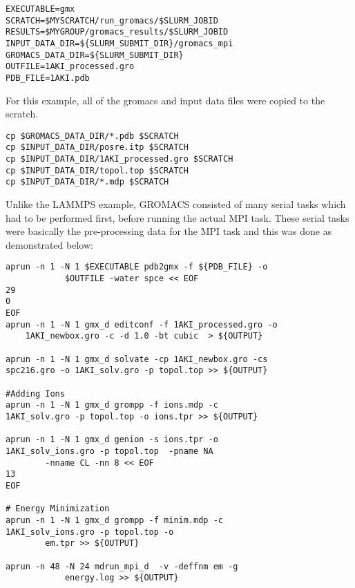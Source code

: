 \begin{tcolorbox}
\begin{Verbatim}[fontsize=\scriptsize]
EXECUTABLE=gmx 
SCRATCH=$MYSCRATCH/run_gromacs/$SLURM_JOBID
RESULTS=$MYGROUP/gromacs_results/$SLURM_JOBID
INPUT_DATA_DIR=${SLURM_SUBMIT_DIR}/gromacs_mpi
GROMACS_DATA_DIR=${SLURM_SUBMIT_DIR}
OUTFILE=1AKI_processed.gro
PDB_FILE=1AKI.pdb
\end{Verbatim}
\end{tcolorbox}

For this example, all of the gromacs and input data files were copied to the scratch.

\begin{tcolorbox}
\begin{Verbatim}[fontsize=\scriptsize] 
cp $GROMACS_DATA_DIR/*.pdb $SCRATCH
cp $INPUT_DATA_DIR/posre.itp $SCRATCH
cp $INPUT_DATA_DIR/1AKI_processed.gro $SCRATCH
cp $INPUT_DATA_DIR/topol.top $SCRATCH
cp $INPUT_DATA_DIR/*.mdp $SCRATCH
\end{Verbatim}
\end{tcolorbox}

Unlike the LAMMPS example, GROMACS consisted of many serial tasks which had to be performed first, before running the actual MPI task. These serial 
tasks were basically the pre-processing data for the MPI task and this was done as demonstrated below:
  
\begin{tcolorbox}
\begin{Verbatim}[fontsize=\scriptsize] 
aprun -n 1 -N 1 $EXECUTABLE pdb2gmx -f ${PDB_FILE} -o 
			$OUTFILE -water spce << EOF
29
0
EOF
aprun -n 1 -N 1 gmx_d editconf -f 1AKI_processed.gro -o 
	1AKI_newbox.gro -c -d 1.0 -bt cubic  > ${OUTPUT}

aprun -n 1 -N 1 gmx_d solvate -cp 1AKI_newbox.gro -cs 
spc216.gro -o 1AKI_solv.gro -p topol.top >> ${OUTPUT}

#Adding Ions
aprun -n 1 -N 1 gmx_d grompp -f ions.mdp -c 
1AKI_solv.gro -p topol.top -o ions.tpr >> ${OUTPUT}

aprun -n 1 -N 1 gmx_d genion -s ions.tpr -o 
1AKI_solv_ions.gro -p topol.top  -pname NA 
		-nname CL -nn 8 << EOF 
13
EOF

# Energy Minimization
aprun -n 1 -N 1 gmx_d grompp -f minim.mdp -c 
1AKI_solv_ions.gro -p topol.top -o 
		em.tpr >> ${OUTPUT}

aprun -n 48 -N 24 mdrun_mpi_d  -v -deffnm em -g 
			energy.log >> ${OUTPUT}
\end{Verbatim}
\end{tcolorbox}


